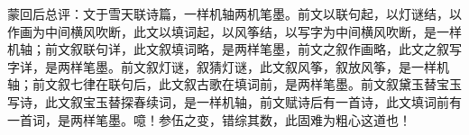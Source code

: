 \begin{parag}
    \begin{note}蒙回后总评：文于雪天联诗篇，一样机轴两机笔墨。前文以联句起，以灯谜结，以作画为中间横风吹断，此文以填词起，以风筝结，以写字为中间横风吹断，是一样机轴；前文叙联句详，此文叙填词略，是两样笔墨，前文之叙作画略，此文之叙写字详，是两样笔墨。前文叙灯谜，叙猜灯谜，此文叙风筝，叙放风筝，是一样机轴；前文叙七律在联句后，此文叙古歌在填词前，是两样笔墨。前文叙黛玉替宝玉写诗，此文叙宝玉替探春续词，是一样机轴，前文赋诗后有一首诗，此文填词前有一首词，是两样笔墨。噫！参伍之变，错综其数，此固难为粗心这道也！\end{note}
\end{parag}
